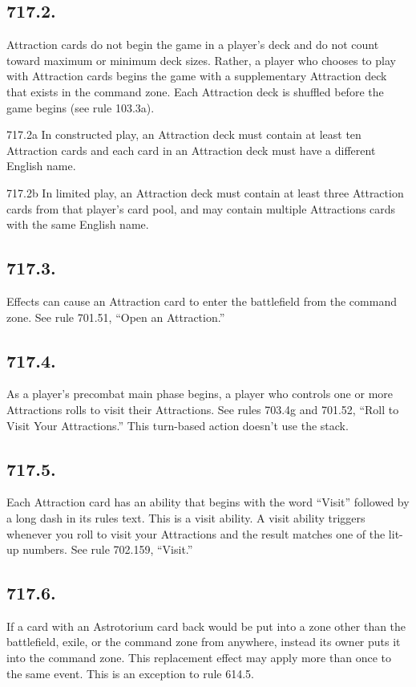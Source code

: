 \subsection*{717.2.}
Attraction cards do not begin the game in a player’s deck and do not count toward maximum or minimum deck sizes. Rather, a player who chooses to play with Attraction cards begins the game with a supplementary Attraction deck that exists in the command zone. Each Attraction deck is shuffled before the game begins (see rule 103.3a).

717.2a In constructed play, an Attraction deck must contain at least ten Attraction cards and each card in an Attraction deck must have a different English name.

717.2b In limited play, an Attraction deck must contain at least three Attraction cards from that player’s card pool, and may contain multiple Attractions cards with the same English name.

\subsection*{717.3.}
Effects can cause an Attraction card to enter the battlefield from the command zone. See rule 701.51, “Open an Attraction.”

\subsection*{717.4.}
As a player’s precombat main phase begins, a player who controls one or more Attractions rolls to visit their Attractions. See rules 703.4g and 701.52, “Roll to Visit Your Attractions.” This turn-based action doesn’t use the stack.

\subsection*{717.5.}
Each Attraction card has an ability that begins with the word “Visit” followed by a long dash in its rules text. This is a visit ability. A visit ability triggers whenever you roll to visit your Attractions and the result matches one of the lit-up numbers. See rule 702.159, “Visit.”

\subsection*{717.6.}
If a card with an Astrotorium card back would be put into a zone other than the battlefield, exile, or the command zone from anywhere, instead its owner puts it into the command zone. This replacement effect may apply more than once to the same event. This is an exception to rule 614.5.

